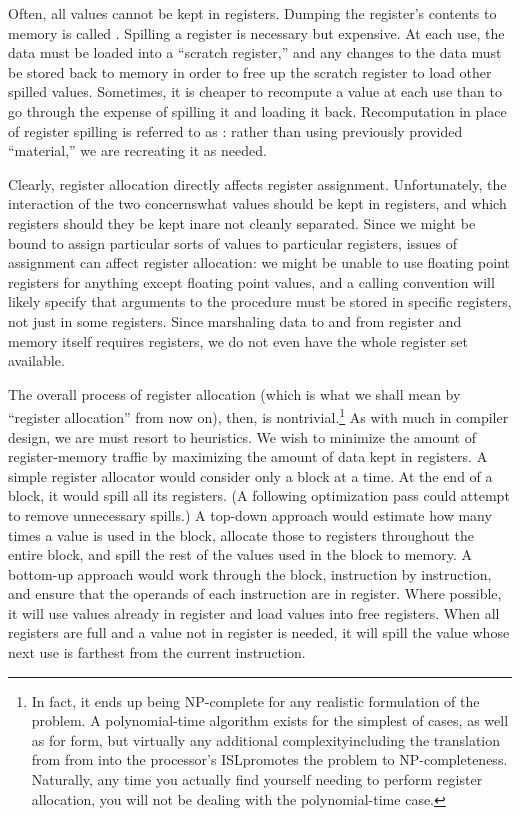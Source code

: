 Often, all values cannot be kept in registers. Dumping the register's contents to memory is called . Spilling a register is necessary but expensive. At each use, the data must be loaded into a ``scratch register,'' and any changes to the data must be stored back to memory in order to free up the scratch register to load other spilled values. Sometimes, it is cheaper to recompute a value at each use than to go through the expense of spilling it and loading it back. Recomputation in place of register spilling is referred to as : rather than using previously provided ``material,'' we are recreating it as needed.

Clearly, register allocation directly affects register assignment. Unfortunately, the interaction of the two concerns\empause what values should be kept in registers, and which registers should they be kept in\empause are not cleanly separated. Since we might be bound to assign particular sorts of values to particular registers, issues of assignment can affect register allocation: we might be unable to use floating point registers for anything except floating point values, and a calling convention will likely specify that arguments to the procedure must be stored in specific registers, not just in some registers. Since marshaling data to and from register and memory itself requires registers, we do not even have the whole register set available.

The overall process of register allocation (which is what we shall mean by ``register allocation'' from now on), then, is nontrivial.\footnote{In fact, it ends up being NP-complete for any realistic formulation of the problem. A polynomial-time algorithm exists for the simplest of cases, as well as for \SSA form, but virtually any additional complexity\empause including the translation from \SSA from into the processor's ISL\empause promotes the problem to NP-completeness. Naturally, any time you actually find yourself needing to perform register allocation, you will not be dealing with the polynomial-time case.} As with much in compiler design, we are must resort to heuristics. We wish to minimize the amount of register-memory traffic by maximizing the amount of data kept in registers. A simple register allocator would consider only a block at a time. At the end of a block, it would spill all its registers. (A following optimization pass could attempt to remove unnecessary spills.) A top-down approach would estimate how many times a value is used in the block, allocate those to registers throughout the entire block, and spill the rest of the values used in the block to memory. A bottom-up approach would work through the block, instruction by instruction, and ensure that the operands of each instruction are in register. Where possible, it will use values already in register and load values into free registers. When all registers are full and a value not in register is needed, it will spill the value whose next use is farthest from the current instruction.


